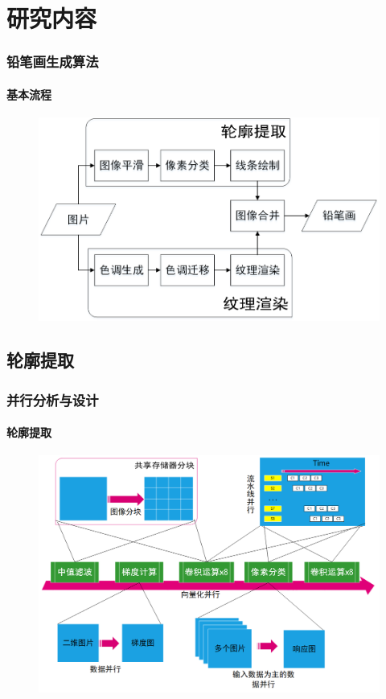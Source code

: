 \documentclass[aspectratio=43, xcolor=svgnames, t, 10pt]{beamer}
\begin{document}
\section{研究内容}
\begin{frame}
  \frametitle{铅笔画生成算法}
  \framesubtitle{基本流程}
  \begin{figure}
    \centering
    \includegraphics[width=\linewidth]{./figure/alg_flowchart.png}
  \end{figure}
\end{frame}

\subsection{轮廓提取}
\begin{frame}
  \frametitle{并行分析与设计}
  \framesubtitle{轮廓提取}
  \begin{figure}
    \includegraphics[width=\linewidth]{./figure/ext_stroke_design.png}
  \end{figure}
\end{frame}
\end{document}
